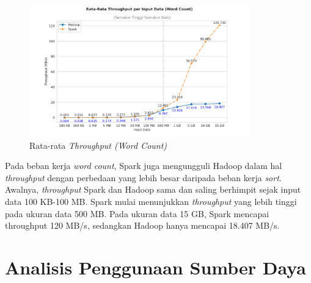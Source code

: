 \begin{figure}[h]
    \centering
    \includegraphics[width=0.85\textwidth]{figures/ch04/2-mean-throughput-wordcount.png}
    \caption{Rata-rata \textit{Throughput (Word Count)}}
    \label{fig:mean-throughput-wordcount}
\end{figure}

Pada beban kerja \textit{word count}, Spark juga mengungguli Hadoop dalam hal \textit{throughput} dengan perbedaan yang lebih besar daripada beban kerja \textit{sort}. Awalnya, \textit{throughput} Spark dan Hadoop sama dan saling berhimpit sejak input data 100 KB-100 MB. Spark mulai menunjukkan \textit{throughput} yang lebih tinggi pada ukuran data 500 MB.  Pada ukuran data 15 GB, Spark mencapai throughput 120 MB/s, sedangkan Hadoop hanya mencapai 18.407 MB/s.

%
%
%



\newpage
\section{Analisis Penggunaan Sumber Daya}
